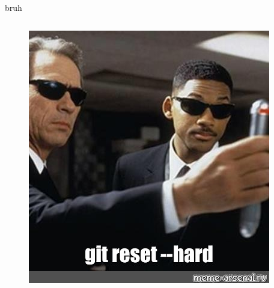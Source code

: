 \documentclass[
  ignorenonframetext,
  aspectratio=169,
]{beamer}
\begin{document}
\begin{frame}{bruh}
\protect\hypertarget{bruh}{}
\begin{columns}
\begin{figure}
    \includegraphics[width=.7\textwidth]{images/image_proxy.jpg}
\end{figure}
\end{columns}
\end{frame}
\end{document}
